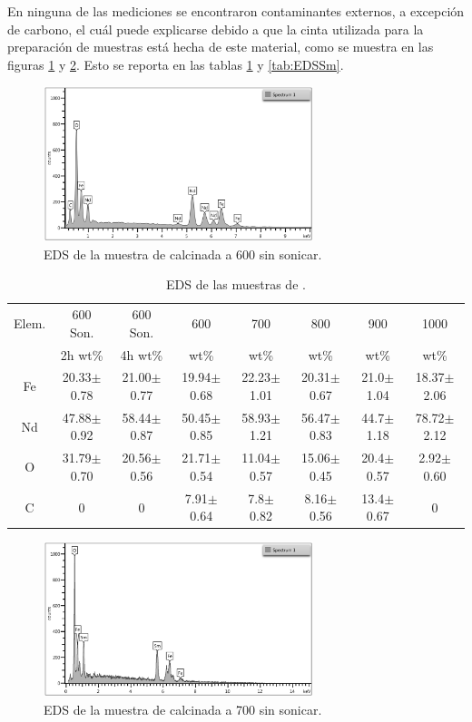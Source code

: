 \documentclass[../main.tex]{subfiles}
\begin{document}
En ninguna de las mediciones se encontraron contaminantes externos, a excepción de carbono, el cuál puede explicarse debido a que la cinta utilizada para la preparación de muestras está hecha de este material, como se muestra en las figuras \ref{fig:resEDSNeod} y \ref{fig:resEDSSama}. Esto se reporta en las tablas \ref{tab:EDSNd} y \ref{tab:EDSSm}.
\begin{figure}[H]
    \centering
    \includegraphics[width=0.7\textwidth]{fig/resEDSNeod.png}
    \caption{EDS de la muestra de \neod{} calcinada a 600\gradoC{} sin sonicar.}
    \label{fig:resEDSNeod}
\end{figure}
\begin{table}[H]
    \begin{tabular}{|c||c|c|c|c|c|c|c|}
        \hline
        Elem. &600\gradoC{} Son.&600\gradoC{} Son.&600\gradoC{}&700\gradoC{}&800\gradoC{}&900\gradoC{}&1000\gradoC{}\\
        &2h wt\%&4h wt\%&wt\%&wt\%&wt\%&wt\%&wt\%\\
        \hline\hline
        Fe & 20.33$\pm$0.78 &21.00$\pm$0.77& 19.94$\pm$0.68 & 22.23$\pm$1.01 & 20.31$\pm$0.67 & 21.0$\pm$1.04 & 18.37$\pm$2.06 \\
        Nd & 47.88$\pm$0.92 &58.44$\pm$0.87& 50.45$\pm$0.85 & 58.93$\pm$1.21 & 56.47$\pm$0.83 & 44.7$\pm$1.18 & 78.72$\pm$2.12 \\
        O & 31.79$\pm$0.70 &20.56$\pm$0.56& 21.71$\pm$0.54 & 11.04$\pm$0.57 & 15.06$\pm$0.45 & 20.4$\pm$0.57 & 2.92$\pm$0.60 \\
        C & 0 & 0 & 7.91$\pm$0.64 & 7.8$\pm$0.82 & 8.16$\pm$0.56 & 13.4$\pm$0.67 &0 \\ 
        \hline
        \end{tabular} 
            \caption{EDS de las muestras de \neod{}.}
            \label{tab:EDSNd}
        \end{table}
\begin{figure}[H]
    \centering
    \includegraphics[width=0.7\textwidth]{fig/resEDSSama.png}
    \caption{EDS de la muestra de \sama{} calcinada a 700\gradoC{} sin sonicar.}
    \label{fig:resEDSSama}
\end{figure}
\end{document}
